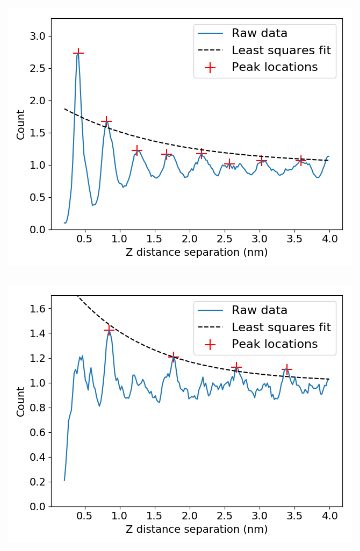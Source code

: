 \documentclass{article}
\begin{document}
  \begin{figure}
  \centering
  \begin{subfigure}{0.45\textwidth}
  \centering
  \includegraphics[width=\textwidth]{z_correlation_sandwich.png}
  \caption{}\label{fig:z_correlation_sandwich}
  \end{subfigure}  
  \begin{subfigure}{0.45\textwidth}
  \centering
  \includegraphics[width=\textwidth]{z_correlation_offset.png}
  \caption{}\label{fig:z_correlation_offset}
  \end{subfigure}  
  \begin{subfigure}{0.45\textwidth}

\end{subfigure}
\end{figure}
\end{document}
